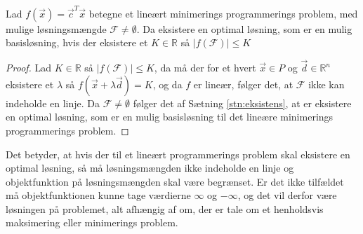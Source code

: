 \begin{kor}
Lad $f(\vec{x}) = \vec{c}^T\vec{x}$ betegne et lineært minimerings programmerings problem, med mulige løsningsmængde $\mathcal{F} \neq \emptyset$. 
Da eksistere en optimal løsning, som er en mulig basisløsning, hvis der eksistere et $K \in \mathds{R}$ så $|f(\mathcal{F})| \leq K$ 
\label{kor:eksistens}
\end{kor}
\begin{proof}
Lad  $K \in \mathds{R}$ så $|f(\mathcal{F})| \leq K$, da må der for et hvert $\vec{x} \in P$ og $\vec{d} \in \mathds{R}^n$ eksistere et $\lambda$ så $f(\vec{x}+\lambda \vec{d}) = K$, og da $f$ er lineær, følger det, at $\mathcal{F}$ ikke kan indeholde en linje. 
Da $\mathcal{F} \neq \emptyset$ følger det af Sætning \ref{stn:eksistens}, at er eksistere en optimal løsning, som er en mulig basisløsning til det lineære minimerings programmerings problem.
\end{proof}
Det betyder, at hvis der til et lineært programmerings problem skal eksistere en optimal løsning, så må løsningsmængden ikke indeholde en linje og objektfunktion på løsningsmængden skal være begrænset. 
Er det ikke tilfældet må objektfunktionen kunne tage værdierne $\infty$ og $-\infty$, og det vil derfor være løsningen på problemet, alt afhængig af om, der er tale om et henholdsvis maksimering eller minimerings problem.




